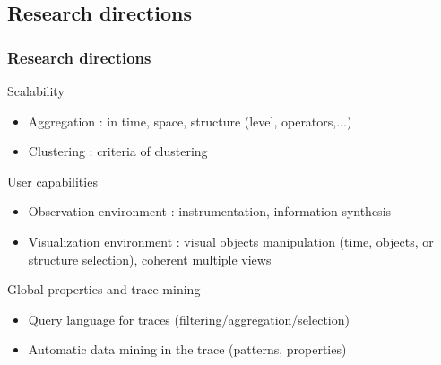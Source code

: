 \subsection{Research directions}
\frame
{
  \frametitle{Research directions}
\begin{block}{Scalability}
\begin{itemize}
\item Aggregation : in time, space, structure (level, operators,...)
\item Clustering : criteria of clustering
  \end{itemize}
  \end{block}
\pause
\begin{block}{User capabilities}
\begin{itemize}
\item Observation environment : instrumentation, information synthesis
\item Visualization environment : visual objects manipulation (time, objects, or structure selection),  coherent multiple views
  \end{itemize}
  \end{block}
\pause
\begin{block}{Global properties and trace mining}
\begin{itemize}
\item Query language for traces (filtering/aggregation/selection)
\item Automatic data mining in the trace (patterns, properties)
 \end{itemize}
  \end{block}


}

